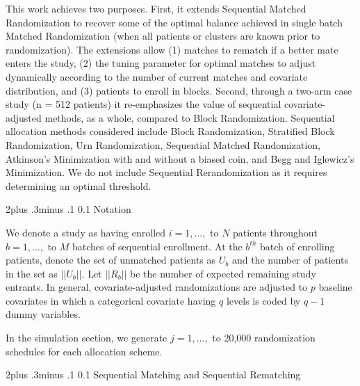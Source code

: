 \documentclass[12pt,oneside]{book}
\makeatletter
\newlength{\li}\setlength{\li}{14.48pt}
\newlength{\di}\setlength{\di}{-3.5mm}
\renewcommand\section{ \@startsection {section}{1}{\z@}%
    {2\@bls  plus .3\@bls minus .1\@bls}%
    {0.1\@bls}%
    {\centering\normalfont}}
\theoremstyle{definition}
\theoremstyle{definition}
\theoremstyle{definition}
\theoremstyle{remark}
\makeatother
\begin{document}
This work achieves two purposes. First, it extends Sequential Matched
Randomization to recover some of the optimal balance achieved in single
batch Matched Randomization (when all patients or clusters are known
prior to randomization). The extensions allow (1) matches to rematch if
a better mate enters the study, (2) the tuning parameter for optimal
matches to adjust dynamically according to the number of current matches
and covariate distribution, and (3) patients to enroll in blocks.
Second, through a two-arm case study (n = 512 patients) it re-emphasizes
the value of sequential covariate-adjusted methods, as a whole, compared
to Block Randomization. Sequential allocation methods considered include
Block Randomization, Stratified Block Randomization, Urn Randomization,
Sequential Matched Randomization, Atkinson's Minimization with and
without a biased coin, and Begg and Iglewicz's Minimization. We do not
include Sequential Rerandomization as it requires determining an optimal
threshold.

\hypertarget{notation}{%
\section{Notation}\label{notation}}

We denote a study as having enrolled \(i = 1, \dots,\) to \(N\) patients
throughout \(b = 1,\dots,\) to \(M\) batches of sequential enrollment.
At the \(b^{th}\) batch of enrolling patients, denote the set of
unmatched patients as \(U_b\) and the number of patients in the set as
\(||U_b||\). Let \(||R_b||\) be the number of expected remaining study
entrants. In general, covariate-adjusted randomizations are adjusted to
\(p\) baseline covariates in which a categorical covariate having \(q\)
levels is coded by \(q-1\) dummy variables.

In the simulation section, we generate \(j = 1, \dots,\) to 20,000
randomization schedules for each allocation scheme.

\hypertarget{sequential-matching-and-sequential-rematching}{%
\section{Sequential Matching and Sequential
Rematching}\label{sequential-matching-and-sequential-rematching}}
\end{document}
